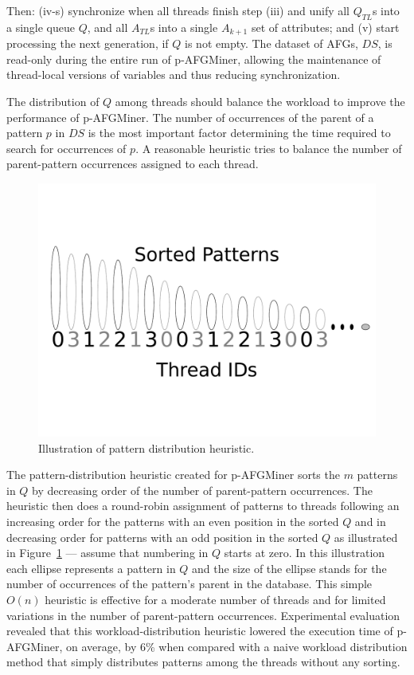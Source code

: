 Then: (iv-s) synchronize when all threads finish step (iii) and unify all $Q_{TL}$s into a single queue $Q$, and all $A_{TL}$s into a single $A_{k+1}$ set of attributes; and (v) start processing the next generation, if $Q$ is not empty. The dataset of AFGs, $DS$, is read-only during the entire run of p-AFGMiner, allowing the maintenance of thread-local versions of variables and thus reducing synchronization.

The distribution of $Q$ among threads should balance the workload to improve the performance of p-AFGMiner. The number of occurrences of the parent of a pattern $p$ in $DS$ is the most important factor determining the time required to search for occurrences of $p$. A reasonable heuristic tries to balance the number of parent-pattern occurrences assigned to each thread. 

\begin{figure}[h!]
\centering
    \includegraphics[scale=0.2]{figures/WorkDistributionHeuristic.pdf}
    \caption{Illustration of pattern distribution heuristic.}
    \label{fig:WorkDistributionHeuristic}  
\end{figure}

The pattern-distribution heuristic created for p-AFGMiner sorts the $m$ patterns in $Q$ by decreasing order of the number of parent-pattern occurrences. The heuristic then does a round-robin assignment of patterns to threads following an increasing order for the patterns with an even position in the sorted $Q$ and in decreasing order for patterns with an odd position in the sorted $Q$ as illustrated in Figure~\ref{fig:WorkDistributionHeuristic} --- assume that numbering in $Q$ starts at zero. In this illustration each ellipse represents a pattern in $Q$ and the size of the ellipse stands for the number of occurrences of the pattern's parent in the database.
This simple $O(n)$ heuristic is effective for a moderate number of threads and for limited variations in the number of parent-pattern occurrences. Experimental evaluation revealed that this workload-distribution heuristic lowered the execution time of p-AFGMiner, on average, by 6\% when compared with a naive workload distribution method that simply distributes patterns among the threads without any sorting.


 


 
